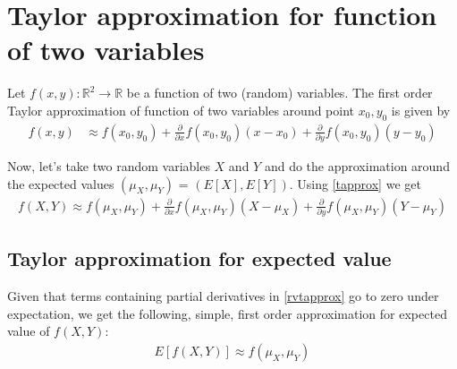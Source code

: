 \documentclass{article}
\begin{document}
\section{Taylor approximation for function of two variables}

Let $f(x, y): \mathbb{R}^2 \rightarrow \mathbb{R}$ be a function of two (random) variables. The first order Taylor approximation of function of two variables around point $x_0, y_0$ is given by
\begin{align}
    f(x, y) &\approx f(x_0, y_0) + \frac{\partial }{\partial x} f(x_0, y_0) (x - x_0) + \frac{\partial }{\partial y} f(x_0, y_0) (y - y_0) \label{tapprox}
\end{align}

Now, let's take two random variables $X$ and $Y$ and do the approximation around the expected values $(\mu_X, \mu_Y)$ = $(E[X], E[Y])$. Using \eqref{tapprox} we get
\begin{align}
    f(X, Y) \approx f(\mu_X, \mu_Y) + \frac{\partial }{\partial x} f(\mu_X, \mu_Y) (X - \mu_X) + \frac{\partial }{\partial y} f(\mu_X, \mu_Y) (Y - \mu_Y) \label{rvtapprox}
\end{align}

\subsection{Taylor approximation for expected value}
Given that terms containing partial derivatives in \eqref{rvtapprox} go to zero under expectation, we get the following, simple, first order approximation for expected value of $f(X, Y)$:
\begin{align}
    E[f(X, Y)] \approx f(\mu_X, \mu_Y) \label{eapprox}
\end{align}
\end{document}
